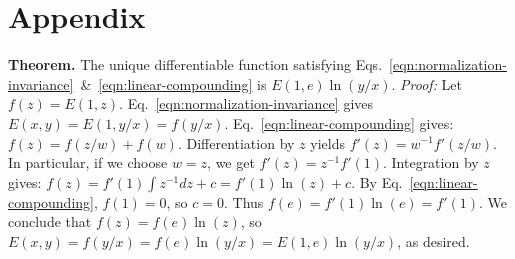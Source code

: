 \documentclass[twocolumn,final]{svjour3}
\newcommand{\M}{\mathsf{M}}
\newcommand{\E}[1]{\left<#1\right>}
\newcommand{\abs}[1]{\left|#1\right|}
\begin{document}

\section*{Appendix}
\footnotesize

\noindent
\textbf{Theorem.} The unique differentiable function satisfying Eqs.~\ref{eqn:normalization-invariance}~\&~\ref{eqn:linear-compounding} is $E(1,e) \ln(y/x)$. \textit{Proof:} Let $f(z) = E(1,z)$. Eq.~\ref{eqn:normalization-invariance} gives $E(x,y) = E(1,y/x) = f(y/x)$. Eq.~\ref{eqn:linear-compounding} gives: $f(z) = f(z/w) + f(w)$. Differentiation by $z$ yields $f'(z) = w^{-1} f'(z/w)$. In particular, if we choose $w=z$, we get $f'(z) = z^{-1} f'(1)$. Integration by $z$ gives:
$f(z) = f'(1) \int z^{-1} dz + c = f'(1) \ln(z) + c$.
By Eq.~\ref{eqn:linear-compounding}, $f(1)=0$, so $c=0$. Thus $f(e)=f'(1)\ln(e)=f'(1)$. We conclude that $f(z)=f(e)\ln(z)$, so $E(x,y) = f(y/x) = f(e)\ln(y/x) = E(1,e)\ln(y/x)$, as desired.\hfill%





\end{document}
